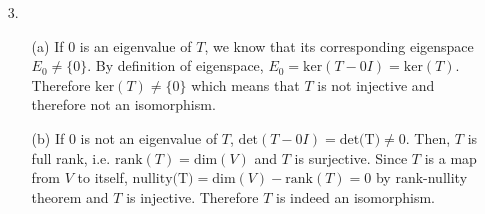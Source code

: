 \documentclass{article}
\begin{document}
\newpage
\begin{itemize}
    \item [3.]
          \begin{itemize}
              \item [(a)] If $0$ is an eigenvalue of $T$, we know that its corresponding eigenspace $E_0\neq\{0\}$. By definition of eigenspace, $E_0=\text{ker}(T-0I)=\text{ker}(T)$. Therefore $\text{ker}(T)\neq\{0\}$ which means that $T$ is not injective and therefore not an isomorphism.
              \item [(b)] If $0$ is not an eigenvalue of $T$, $\text{det}(T-0I)=\text{det(T)}\neq 0$. Then, $T$ is full rank, i.e. $\text{rank}(T)=\text{dim}(V)$ and $T$ is surjective. Since $T$ is a map from $V$ to itself, $\text{nullity(T)}=\text{dim}(V)-\text{rank}(T)=0$ by rank-nullity theorem and $T$ is injective. Therefore $T$ is indeed an isomorphism.
          \end{itemize}
\end{itemize}
\end{document}
